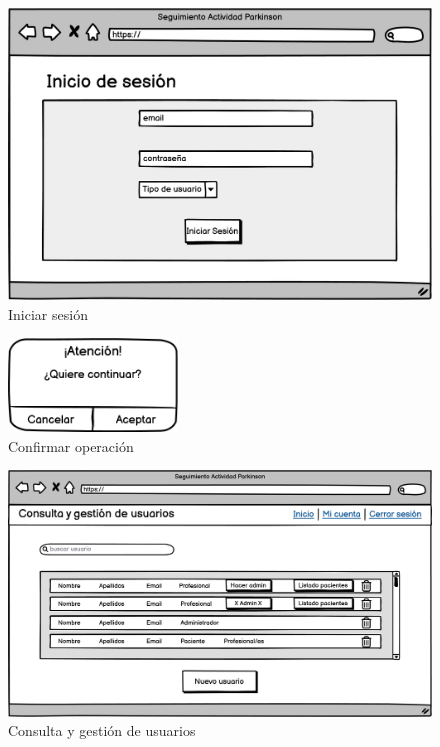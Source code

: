 \begin{figure}[h]
    \centering
    \includegraphics[width=1\textwidth]{img/UI_Wireframes/UI_CU-1_Iniciar sesión.png}
    \caption{Iniciar sesión}
    \label{fig:Iniciar sesión}
\end{figure}

\begin{figure}[h]
    \centering
    \includegraphics[width=0.4\textwidth]{img/UI_Wireframes/UI_CU-2_Confirmar operación.png}
    \caption{Confirmar operación}
    \label{fig:Confirmar operación}
\end{figure}

\begin{figure}[h]
    \centering
    \includegraphics[width=1\textwidth]{img/UI_Wireframes/UI_CU-7_Consulta y gestión de usuarios.png}
    \caption{Consulta y gestión de usuarios}
    \label{fig:Consulta y gestión de usuarios}
\end{figure}

